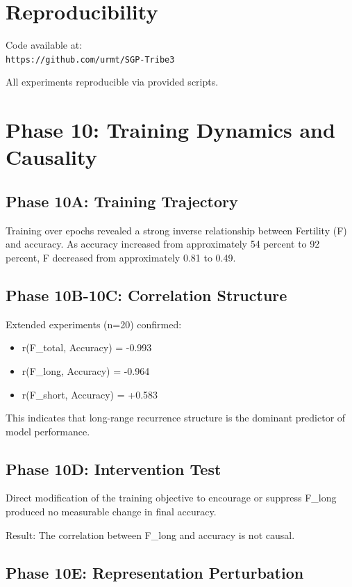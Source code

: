 \documentclass[11pt]{article}
\begin{document}
\section{Reproducibility}

Code available at:\\ \texttt{https://github.com/urmt/SGP-Tribe3}

All experiments reproducible via provided scripts.

\section{Phase 10: Training Dynamics and Causality}

\subsection{Phase 10A: Training Trajectory}

Training over epochs revealed a strong inverse relationship between Fertility (F) and accuracy. As accuracy increased from approximately 54 percent to 92 percent, F decreased from approximately 0.81 to 0.49.

\subsection{Phase 10B-10C: Correlation Structure}

Extended experiments (n=20) confirmed:

\begin{itemize}
	\item r(F\_total, Accuracy) = -0.993
	\item r(F\_long, Accuracy) = -0.964
	\item r(F\_short, Accuracy) = +0.583
\end{itemize}

This indicates that long-range recurrence structure is the dominant predictor of model performance.

\subsection{Phase 10D: Intervention Test}

Direct modification of the training objective to encourage or suppress F\_long produced no measurable change in final accuracy.

Result: The correlation between F\_long and accuracy is not causal.

\subsection{Phase 10E: Representation Perturbation}
\end{document}

